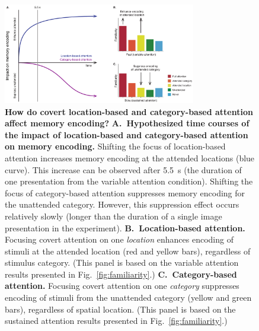 \documentclass[english]{article}
\begin{document}
\begin{figure}[tp]
  \centering \includegraphics[width=0.75\textwidth]{figs/discussion_schematic}

  \caption{\textbf{How do covert location-based and category-based attention
  affect memory encoding?} \textbf{A.~Hypothesized time courses of the impact of
  location-based and category-based attention on memory encoding.} Shifting the
  focus of location-based attention increases memory encoding at the attended
  locations (blue curve). This increase can be observed after 5.5~s (the
  duration of one presentation from the variable attention condition). Shifting
  the focus of category-based attention suppresses memory encoding for the
  unattended category. However, this suppression effect occurs relatively
  slowly (longer than the duration of a single image presentation in the
  experiment). \textbf{B.~Location-based attention.} Focusing covert attention
  on one \textit{location} enhances encoding of stimuli at the attended
  location (red and yellow bars), regardless of stimulus category. (This panel
  is based on the variable attention results presented in
  Fig.~\ref{fig:familiarity}.) \textbf{C.~Category-based attention.} Focusing
  covert attention on one \textit{category} suppresses encoding of stimuli from
  the unattended category (yellow and green bars), regardless of spatial
  location. (This panel is based on the sustained attention results presented
  in Fig.~\ref{fig:familiarity}.)}

\label{fig:discussion}
\end{figure}
\end{document}
